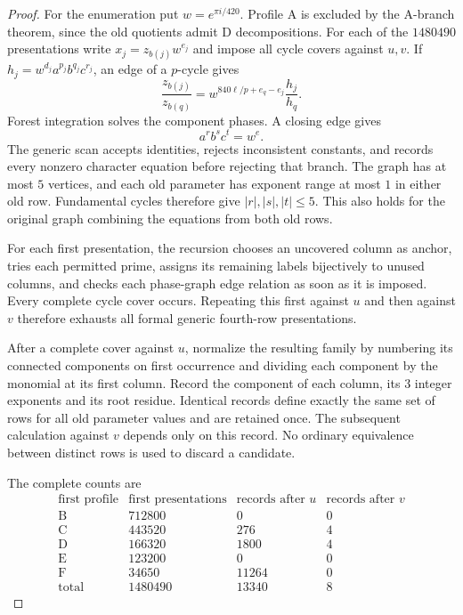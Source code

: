 \documentclass[11pt,a4paper]{article}
\theoremstyle{plain}
\theoremstyle{definition}
\theoremstyle{plain}
\begin{document}
\begin{proof}
For the enumeration put $w=e^{\pi i/420}$. Profile $\mathrm{A}$ is excluded by the $\mathrm{A}$-branch theorem, since the old quotients admit $\mathrm{D}$ decompositions. For each of the $1480490$ presentations write $x_j=z_{b(j)}w^{e_j}$ and impose all cycle covers against $u,v$. If $h_j=w^{d_j}a^{p_j}b^{q_j}c^{r_j}$, an edge of a $p$-cycle gives
\[
\frac{z_{b(j)}}{z_{b(q)}}=w^{840\ell/p+e_q-e_j}\frac{h_j}{h_q}.
\]
Forest integration solves the component phases. A closing edge gives
\[
a^r b^s c^t=w^{e}.
\]
The generic scan accepts identities, rejects inconsistent constants, and records every nonzero character equation before rejecting that branch. The graph has at most $5$ vertices, and each old parameter has exponent range at most $1$ in either old row. Fundamental cycles therefore give $|r|,|s|,|t|\le5$. This also holds for the original graph combining the equations from both old rows.

\medskip
For each first presentation, the recursion chooses an uncovered column as anchor, tries each permitted prime, assigns its remaining labels bijectively to unused columns, and checks each phase-graph edge relation as soon as it is imposed. Every complete cycle cover occurs. Repeating this first against $u$ and then against $v$ therefore exhausts all formal generic fourth-row presentations.

After a complete cover against $u$, normalize the resulting family by numbering its connected components on first occurrence and dividing each component by the monomial at its first column. Record the component of each column, its 3 integer exponents and its root residue. Identical records define exactly the same set of rows for all old parameter values and are retained once. The subsequent calculation against $v$ depends only on this record. No ordinary equivalence between distinct rows is used to discard a candidate.

The complete counts are
\[
\begin{array}{c|r|r|r}
\text{first profile}&\text{first presentations}&
 \text{records after }u&\text{records after }v\\\hline
\mathrm{B}&712800&0&0\\
\mathrm{C}&443520&276&4\\
\mathrm{D}&166320&1800&4\\
\mathrm{E}&123200&0&0\\
\mathrm{F}&34650&11264&0\\\hline
\text{total}&1480490&13340&8
\end{array}
\]


\end{proof}
\end{document}
